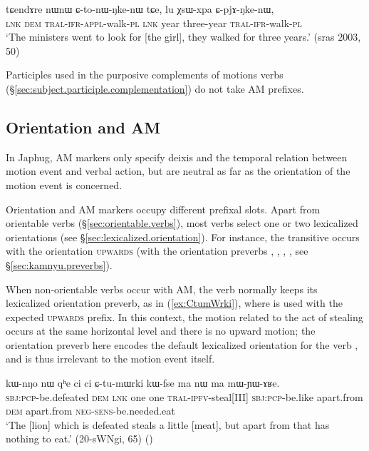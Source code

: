\begin{exe}
\ex \label{ex:CpjANkenW}
 \gll tɕendɤre nɯnɯ ɕ-to-nɯ-ŋke-nɯ tɕe, lu χsɯ-xpa ɕ-pjɤ-ŋke-nɯ, \\
 \textsc{lnk} \textsc{dem} \textsc{tral}-\textsc{ifr}-\textsc{appl}-walk-\textsc{pl} \textsc{lnk} year three-year \textsc{tral}-\textsc{ifr}-walk-\textsc{pl} \\
\glt `The ministers went to look for [the girl], they walked for three years.' (sras 2003, 50)
\end{exe}

Participles used in the purposive complements of motions verbs (§\ref{sec:subject.participle.complementation}) do not take AM prefixes.

\subsection{Orientation and AM} \label{sec:orientation.AM}
In Japhug, AM markers only specify deixis and the temporal relation between motion event and verbal action, but are neutral as far as the orientation of the motion event is concerned.

Orientation and AM markers occupy different prefixal slots. Apart from orientable verbs (§\ref{sec:orientable.verbs}), most verbs select one or two lexicalized orientations (see §\ref{sec:lexicalized.orientation}). For instance, the transitive  occurs with the orientation \textsc{upwards} (with the orientation preverbs , , , , see §\ref{sec:kamnyu.preverbs}). 

When non-orientable verbs occur with AM, the verb normally keeps its lexicalized orientation preverb, as in (\ref{ex:CtumWrki}), where  is used with the expected  \textsc{upwards} prefix. In this context, the motion related to the act of stealing occurs at the same horizontal level and there is no upward motion; the orientation preverb here encodes the default lexicalized orientation for the verb , and is thus irrelevant to the motion event itself.

\begin{exe}
\ex \label{ex:CtumWrki}
 \gll kɯ-nŋo nɯ qʰe ci ci ɕ-tu-mɯrki kɯ-fse ma nɯ ma mɯ-ɲɯ-ɤʁe. \\
\textsc{sbj}:\textsc{pcp}-be.defeated \textsc{dem} \textsc{lnk} one one \textsc{tral}-\textsc{ipfv}-steal[III] \textsc{sbj}:\textsc{pcp}-be.like apart.from \textsc{dem} apart.from \textsc{neg}-\textsc{sens}-be.needed.eat \\
\glt `The [lion] which is defeated steals a little [meat], but apart from that has nothing to eat.' (20-sWNgi, 65)
()
\end{exe}

